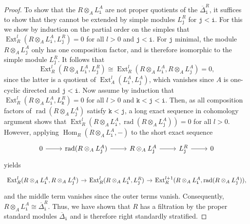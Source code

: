 \documentclass[12pt,a4paper]{amsart}
\theoremstyle{plain}
\theoremstyle{definition}
\numberwithin{equation}{thm}
\DeclareMathOperator{\radoperator}{rad}
\DeclareMathOperator{\Hom}{Hom}
\DeclareMathOperator{\Ext}{Ext}
\begin{document}
\begin{proof}
To show that the $R\otimes_A L_\mathtt{i}^A$ are not proper quotients of the $\overline{\Delta}_\mathtt{i}^R$, it suffices to show that they cannot be extended by simple modules $L_\mathtt{j}^R$ for $\mathtt{j}<\mathtt{i}$. For this we show by induction on the partial order on the simples that $\Ext^l_R(R\otimes_A L_\mathtt{i}^A, L_\mathtt{j}^R)=0$ for all $l>0$ and $\mathtt{j}<\mathtt{i}$. For $\mathtt{j}$ minimal, the module $R\otimes_A L_\mathtt{j}^A$ only has one composition factor, and is therefore isomorphic to the simple module $L_\mathtt{j}^R$. It follows that 
\[\Ext^l_R(R\otimes_A L_\mathtt{i}^A, L_\mathtt{j}^R)\cong \Ext^l_R(R\otimes_A L_\mathtt{i}^A, R\otimes_A L_\mathtt{j}^A)=0,\]
since the latter is a quotient of $\Ext^l_A(L_\mathtt{i}^A,L_\mathtt{j}^A)$, which vanishes since $A$ is one-cyclic directed and $\mathtt{j}<\mathtt{i}$. Now assume by induction that $\Ext^l_R(R\otimes_A L_\mathtt{i}^A, L_\mathtt{k}^R)=0$ for all $l>0$ and $\mathtt{k}<\mathtt{j}<\mathtt{i}$. Then, as all composition factors of $\radoperator(R\otimes_A L_\mathtt{j}^A)$ satisfy $\mathtt{k}<\mathtt{j}$, a long exact sequence in cohomology argument shows that $\Ext^l_R(R\otimes_A L_\mathtt{i}^A, \radoperator(R\otimes_A L_\mathtt{j}^A))=0$ for all $l>0$. However, applying $\Hom_R(R\otimes_A L_\mathtt{i}^A,-)$
 to the short exact sequence 
\[
\begin{tikzcd}
0\arrow{r} &\radoperator(R\otimes_A L_\mathtt{j}^A) \arrow{r} &R\otimes_A L_\mathtt{j}^A\arrow{r} &L_\mathtt{j}^R\arrow{r} &0    
\end{tikzcd}
\]
yields 
\[
\begin{tikzcd}[column sep=2ex]
\Ext^l_R(R\otimes_A L_\mathtt{i}^A, R\otimes_A L_\mathtt{j}^A)\arrow{r} &\Ext^l_R(R\otimes_A L_\mathtt{i}^A, L_\mathtt{j}^R)
\arrow{r} &\Ext^{l+1}_R(R\otimes_A L_\mathtt{i}^A, \radoperator(R\otimes_A L_\mathtt{j}^A)),
\end{tikzcd}
\]
and the middle term vanishes since the outer terms vanish. Consequently, $R\otimes_A L_\mathtt{i}^A\cong \overline{\Delta}_\mathtt{i}^R$. Thus, we have shown that $R$ has a filtration by the proper standard modules $\overline{\Delta}_\mathtt{i}$ and is therefore right standardly stratified.  
\end{proof}
\end{document}
